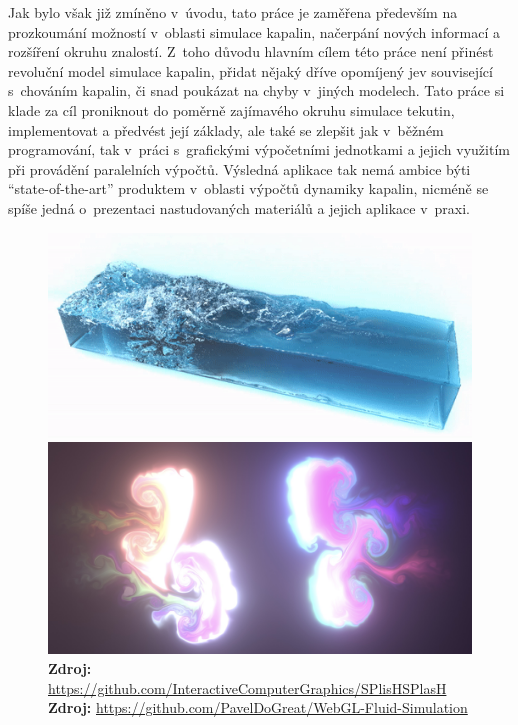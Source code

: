 Jak bylo však již zmíněno v~úvodu, tato práce je zaměřena především na prozkoumání možností v~oblasti simulace kapalin, načerpání nových informací a rozšíření okruhu znalostí. Z~toho důvodu hlavním cílem této práce není přinést revoluční model simulace kapalin, přidat nějaký dříve opomíjený jev související s~chováním kapalin, či snad poukázat na chyby v~jiných modelech. Tato práce si klade za cíl proniknout do poměrně zajímavého okruhu simulace tekutin, implementovat a předvést její základy, ale také se zlepšit jak v~běžném programování, tak v~práci s~grafickými výpočetními jednotkami a jejich využitím při provádění paralelních výpočtů. Výsledná aplikace tak nemá ambice býti \enquote{state-of-the-art} produktem v~oblasti výpočtů dynamiky kapalin, nicméně se spíše jedná o~prezentaci nastudovaných materiálů a jejich aplikace v~praxi.

\begin{figure}[h]\centering
	\centering
	\captionsetup{justification=centering}
	\includegraphics[width=0.5\linewidth]{obrazky-figures/splish-0.png}\hfill
	\includegraphics[width=0.5\linewidth]{obrazky-figures/webglFluid.jpg}\hfill
	\textbf{Zdroj: } \url{https://github.com/InteractiveComputerGraphics/SPlisHSPlasH} \newline
    \textbf{Zdroj: } \url{https://github.com/PavelDoGreat/WebGL-Fluid-Simulation}
	\label{fig:existingSolution}
\end{figure}

